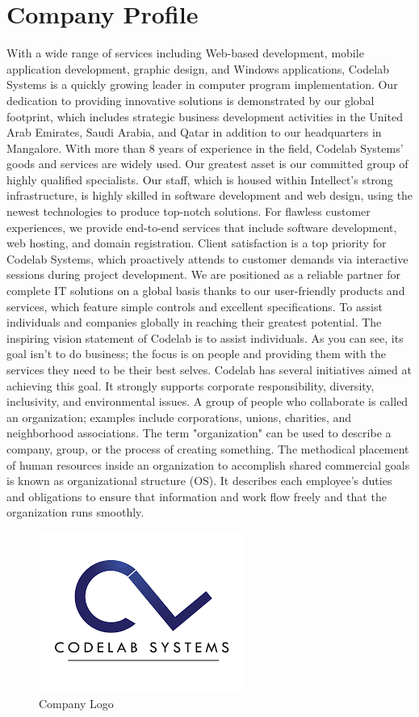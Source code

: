 \section{Company Profile}
With a wide range of services including Web-based development, mobile application development, graphic design, and Windows applications, Codelab Systems is a quickly growing leader in computer program implementation. Our dedication to providing innovative solutions is demonstrated by our global footprint, which includes strategic business development activities in the United Arab Emirates, Saudi Arabia, and Qatar in addition to our headquarters in Mangalore. With more than 8 years of experience in the field, Codelab Systems' goods and services are widely used.
Our greatest asset is our committed group of highly qualified specialists. Our staff, which is housed within Intellect's strong infrastructure, is highly skilled in software development and web design, using the newest technologies to produce top-notch solutions. For flawless customer experiences, we provide end-to-end services that include software development, web hosting, and domain registration. Client satisfaction is a top priority for Codelab Systems, which proactively attends to customer demands via interactive sessions during project development.
We are positioned as a reliable partner for complete IT solutions on a global basis thanks to our user-friendly products and services, which feature simple controls and excellent specifications.
To assist individuals and companies globally in reaching their greatest potential. The inspiring vision statement of Codelab is to assist individuals. As you can see, its goal isn't to do business; the focus is on people and providing them with the services they need to be their best selves.
Codelab has several initiatives aimed at achieving this goal. It strongly supports corporate responsibility, diversity, inclusivity, and environmental issues.
A group of people who collaborate is called an organization; examples include corporations, unions, charities, and neighborhood associations. The term "organization" can be used to describe a company, group, or the process of creating something. The methodical placement of human resources inside an organization to accomplish shared commercial goals is known as organizational structure (OS). It describes each employee's duties and obligations to ensure that information and work flow freely and that the organization runs smoothly.

\begin{figure}[h]
    \centering
    \includegraphics[width=0.5\linewidth]{Images/2.png}
    \caption{Company Logo}
    \label{fig:logo}
\end{figure}

